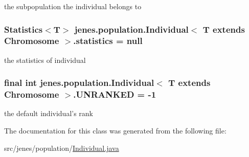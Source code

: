 the subpopulation the individual belongs to \hypertarget{classjenes_1_1population_1_1_individual_3_01_t_01extends_01_chromosome_01_4_ada4319553581f0d52b9623a0f434daad}{
\subsubsection[{statistics}]{\setlength{\rightskip}{0pt plus 5cm}Statistics$<$T$>$ jenes.\-population.\-Individual$<$ T extends Chromosome $>$.statistics = null\hspace{0.3cm}{\ttfamily [private]}}}\label{classjenes_1_1population_1_1_individual_3_01_t_01extends_01_chromosome_01_4_ada4319553581f0d52b9623a0f434daad}
the statistics of individual \hypertarget{classjenes_1_1population_1_1_individual_3_01_t_01extends_01_chromosome_01_4_a6f913202241aa5f7255e482179175f62}{
\subsubsection[{U\-N\-R\-A\-N\-K\-E\-D}]{\setlength{\rightskip}{0pt plus 5cm}final int jenes.\-population.\-Individual$<$ T extends Chromosome $>$.U\-N\-R\-A\-N\-K\-E\-D = -\/1\hspace{0.3cm}{\ttfamily [static]}}}\label{classjenes_1_1population_1_1_individual_3_01_t_01extends_01_chromosome_01_4_a6f913202241aa5f7255e482179175f62}
the default individual's rank 

The documentation for this class was generated from the following file\-:\begin{DoxyCompactItemize}
\item 
src/jenes/population/\hyperlink{_individual_8java}{Individual.\-java}\end{DoxyCompactItemize}
